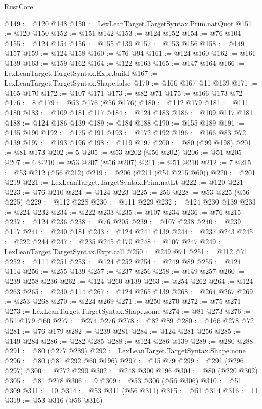 \begin{lexlean}{RustCore}
\begin{coremodule}
@149 := @120 @148
@150 := LexLeanTarget.TargetSyntax.Prim.natQuot
@151 := @120 @150
@152 := @151 @142
@153 := @124 @152
@154 := @76 @104
@155 := @124 @154
@156 := @155 @139
@157 := @153 @156
@158 := @149 @157
@159 := @124 @158
@160 := @76 @94
@161 := @124 @160
@162 := @161 @139
@163 := @159 @162
@164 := @122 @163
@165 := @147 @164
@166 := LexLeanTarget.TargetSyntax.Expr.build
@167 := LexLeanTarget.TargetSyntax.Shape.false
@170 := @166 @167 @11 @139
@171 := @165 @170
@172 := @107 @171
@173 := @82 @71
@175 := @166 @173 @72
@176 := 8
@179 := @53 @176 (@56 @176)
@180 := @112 @179
@181 := @111 @180
@183 := @109 @181 @117
@184 := @124 @183
@186 := @109 @117 @181
@188 := @124 @186 @139
@189 := @184 @188
@190 := @155 @189
@191 := @135 @190
@192 := @175 @191
@193 := @172 @192
@196 := @166 @83 @72 @139
@197 := @193 @196
@198 := @119 @197
@200 := @80 (@99 @198)
@201 := @81 @173
@202 := 5
@205 := @53 @202 (@56 @202)
@206 := @51 @205
@207 := 6
@210 := @53 @207 (@56 @207)
@211 := @51 @210
@212 := 7
@215 := @53 @212 (@56 @212)
@219 := @206 (@211 (@51 @215 @60))
@220 := @201 @219
@221 := LexLeanTarget.TargetSyntax.Prim.natLt
@222 := @120 @221
@223 := @76 @210
@224 := @124 @223
@225 := 256
@228 := @53 @225 (@56 @225)
@229 := @112 @228
@230 := @111 @229
@232 := @124 @230 @139
@233 := @224 @232
@234 := @222 @233
@235 := @107 @234
@236 := @76 @215
@237 := @124 @236
@238 := @76 @205
@239 := @107 @238
@240 := @239 @117
@241 := @240 @181
@243 := @124 @241 @139
@244 := @237 @243
@245 := @222 @244
@247 := @235 @245 @170
@248 := @107 @247
@249 := LexLeanTarget.TargetSyntax.Expr.call
@250 := @249 @71
@251 := @112 @71
@252 := @111 @251
@253 := @124 @252
@254 := @249 @89
@255 := @124 @114
@256 := @255 @139
@257 := @237 @256
@258 := @149 @257
@260 := @239 @258 @236
@262 := @124 @260 @139
@263 := @254 @262
@264 := @124 @263
@265 := @240 @114
@267 := @124 @265 @139
@268 := @264 @267
@269 := @253 @268
@270 := @224 @269
@271 := @250 @270
@272 := @75 @271
@273 := LexLeanTarget.TargetSyntax.Shape.some
@274 := @81 @273
@276 := @51 @179 @60
@277 := @274 @276
@278 := @82 @89
@280 := @166 @278 @72
@281 := @76 @179
@282 := @239 @281
@284 := @124 @281 @256
@285 := @149 @284
@286 := @282 @285
@288 := @124 @286 @139
@289 := @280 @288
@291 := @80 (@277 @289)
@292 := LexLeanTarget.TargetSyntax.Shape.none
@296 := @80 (@81 @292 @60 @196)
@297 := @15 @79
@299 := @291 (@296 @297)
@300 := @272 @299
@302 := @248 @300 @196
@304 := @80 (@220 @302)
@305 := @81 @278
@306 := 9
@309 := @53 @306 (@56 @306)
@310 := @51 @309
@311 := 10
@314 := @53 @311 (@56 @311)
@315 := @51 @314
@316 := 11
@319 := @53 @316 (@56 @316)

\end{coremodule}
\end{lexlean}
